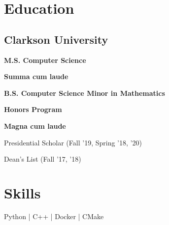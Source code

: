 \documentclass[]{resume-formatting}
\begin{document}
\begin{minipage}[t]{0.29\textwidth} 


\section{Education}
\subsection{Clarkson University}
\vspace{2mm}

\color{subheadings}\fontsize{12pt}{12pt}\selectfont\bfseries{M.S. Computer Science}

\vspace{3mm}
\begin{tightemize}
\item \textbf{Summa cum laude}
\end{tightemize}
\vspace{2mm}

\color{subheadings}\fontsize{12pt}{12pt}\selectfont\bfseries{B.S. Computer Science} \newline
\color{subheadings}\fontsize{12pt}{12pt}\selectfont\bfseries{Minor in Mathematics} \newline
{}
\begin{tightemize}
\item \textbf{Honors Program}%
\item \textbf{Magna cum laude}
\item Presidential Scholar (Fall '19, Spring '18, '20)
\item Dean's List (Fall '17, '18)

\end{tightemize}
\sectionsep


\section{Skills}
 \newline
Python | C++ | Docker | CMake


\end{minipage}
\end{document}
